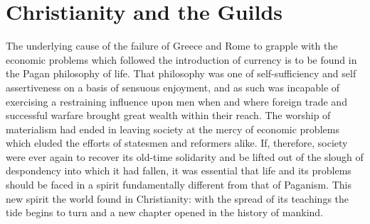 \documentclass{book}
\begin{document}
\chapter{Christianity and the Guilds}
\label{chapter-2}
The underlying cause of the failure of Greece and Rome to grapple with the economic problems which followed the introduction of currency is to be found in the Pagan philosophy of life. That philosophy was one of self-sufficiency and self assertiveness on a basis of sensuous enjoyment, and as such was incapable of exercising a restraining influence upon men when and where foreign trade and successful warfare brought great wealth within their reach. The worship of materialism had ended in leaving society at the mercy of economic problems which eluded the efforts of statesmen and reformers alike. If, therefore, society were ever again to recover its old-time solidarity and be lifted out of the slough of despondency into which it had fallen, it was essential that life and its problems should be faced in a spirit fundamentally different from that of Paganism. This new spirit the world found in Christianity: with the spread of its teachings the tide begins to turn and a new chapter opened in the history of mankind.
\end{document}
